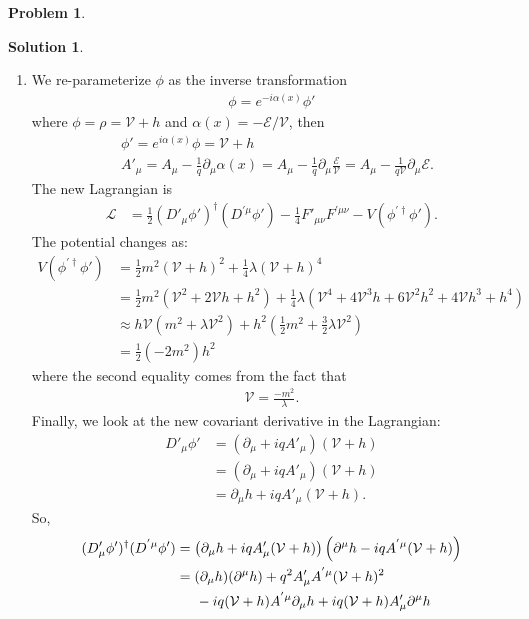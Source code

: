\documentclass{book}
\numberwithin{equation}{section}
\theoremstyle{definition}
\newtheorem{prob}{Problem}[section]
\newtheorem{sln}{Solution}[section]
\newcommand{\p}{\partial}
\newcommand{\lag}{\mathcal{L}}
\newcommand{\E}{\mathcal{E}}
\newcommand{\V}{\mathcal{V}}
\begin{document}
\begin{prob}
\begin{sln}
\begin{enumerate}
				
				\item We re-parameterize $\phi$ as the inverse transformation
				\begin{align}
				\phi = e^{-i\alpha(x)}\phi'
				\end{align}
				where $\phi = \rho = \V + h$  and $\alpha(x) = -\E/\V$, then
				\begin{align}
				&\phi' = e^{i\alpha(x)}\phi = \V + h\\
				&A'_\mu = A_\mu - \frac{1}{q}\p_\mu\alpha(x) = A_\mu - \frac{1}{q}\p_\mu \frac{\E}{\V} = A_\mu - \frac{1}{q\V}\p_\mu\E.
				\end{align}
				The new Lagrangian is
				\begin{align}
				\lag &= \frac{1}{2}(D'_\mu\phi')^\dagger(D^{'\mu}\phi') - \frac{1}{4}F'_{\mu\nu}F^{'\mu\nu} - V(\phi^{'\dagger}\phi').
				\end{align}
				The potential changes as:
				\begin{align}
				V(\phi^{'\dagger}\phi') &= \frac{1}{2}m^2(\V+h)^2 + \frac{1}{4}\lambda (\V+h)^4\nonumber\\
				&= \frac{1}{2}m^2(\V^2 + 2\V h + h^2) + \frac{1}{4}\lambda(\V^4 + 4 \V^3 h + 6\V^2 h^2 + 4\V h^3 + h^4)\nonumber\\
				&\approx  h\V\left(m^2 + \lambda\V^2\right) + h^2\left(\frac{1}{2}m^2 + \frac{3}{2}\lambda\V^2\right)\nonumber\\
				&= \frac{1}{2}(-2m^2)h^2
				\end{align}
				where the second equality comes from the fact that 
				\begin{align}
				\V = \frac{-m^2}{\lambda}.
				\end{align}
				Finally, we look at the new covariant derivative in the Lagrangian:
				\begin{align}
				D'_\mu\phi'
				&= (\p_\mu + iq A'_\mu)(\V+h)\nonumber\\
				&= (\p_\mu + iq A'_\mu)(\V+h)\nonumber\\
				&= \p_\mu h + iq A'_\mu (\V+h).
				\end{align}
				So,
				\begin{align}
				(D'_\mu\phi')^\dagger(D^{'\mu}\phi')
				&= \left(\p_\mu h + iq A'_\mu (\V+h)\right)\left(\p^\mu h - iq A^{'\mu} (\V+h)\right)\nonumber\\
				&= (\p_\mu h)(\p^\mu h) + q^2 A'_\mu A^{'\mu}(\V+h)^2\nonumber\\
				&\hspace{0.5cm} -iq(\V+h) A^{'\mu} \p_\mu h + iq(\V+h)A'_\mu\p^\mu h\nonumber\\

\end{align}
\end{enumerate}
\end{sln}
\end{prob}
\end{document}
